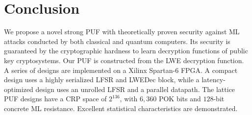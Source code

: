 \section{Conclusion}
\label{sec:conclusion}

We propose a novel strong PUF with theoretically proven security against ML attacks conducted by both classical and quantum computers. 
Its security is guaranteed by the cryptographic hardness to learn decryption functions of public key cryptosystems. 
Our PUF is constructed from the LWE decryption function. 
A series of designs are implemented on a Xilinx Spartan-6 FPGA. 
A compact design uses a highly serialized LFSR and LWEDec block, while a latency-optimized design uses an unrolled LFSR and a parallel datapath. 
The lattice PUF designs have a CRP space of $2^{136}$, with $6,360$ POK bits and $128$-bit concrete ML resistance. 
Excellent statistical characteristics are demonstrated.   